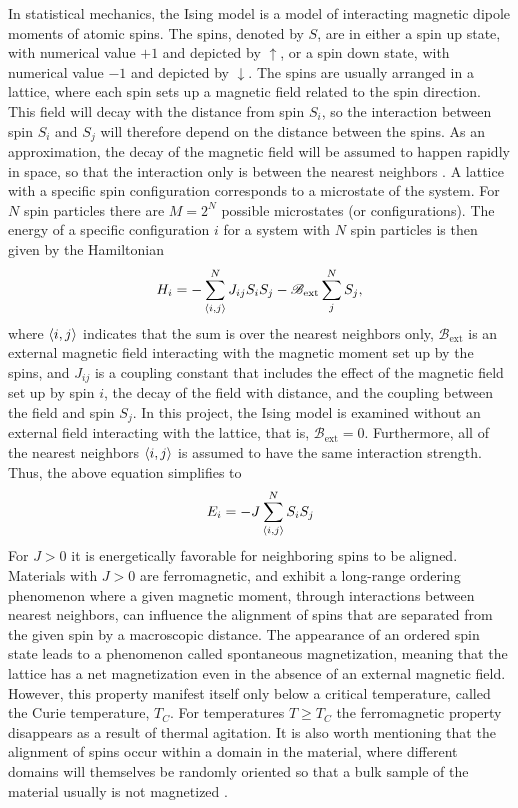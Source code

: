 In statistical mechanics, the Ising model is a model of interacting magnetic dipole moments of atomic spins. The spins, denoted by $S$, are in either a spin up state, with numerical value $+1$ and depicted by $\uparrow$, or a spin down state, with numerical value $- 1$ and depicted by $\downarrow$. The spins are usually arranged in a lattice, where each spin sets up a magnetic field related to the spin direction. This field will decay with the distance from spin $S_i$, so the interaction between spin $S_i$ and $S_j$ will therefore depend on the distance between the spins. As an approximation, the decay of the magnetic field will be assumed to happen rapidly in space, so that the interaction only is between the nearest neighbors \cite[p. 211-212]{Malthe}. A lattice with a specific spin configuration corresponds to a microstate of the system. For $N$ spin particles there are $M=2^N$ possible microstates (or configurations). The energy of a specific configuration $i$ for a system with $N$ spin particles is then given by the Hamiltonian \cite[p. 421]{MHJ}
\begin{equation*}
    H_i = - \sum_{\ev{i,j}}^N J_{ij} S_i S_j - \mathcal{B}_\mathrm{ext} \sum_{j}^N S_j ,
\end{equation*}
where $\ev{i,j}$ indicates that the sum is over the nearest neighbors only, $\mathcal{B}_\mathrm{ext}$ is an external magnetic field interacting with the magnetic moment set up by the spins, and $J_{ij}$ is a coupling constant that includes the effect of the magnetic field set up by spin $i$, the decay of the field with distance, and the coupling between the field and spin $S_j$. In this project, the Ising model is examined without an external field interacting with the lattice, that is, $\mathcal{B}_\mathrm{ext}=0$. Furthermore, all of the nearest neighbors $\ev{i,j}$ is assumed to have the same interaction strength. Thus, the above equation simplifies to
\begin{equation}\label{eq:ising energy}
    E_i = - J \sum_{\ev{i,j}}^N S_i S_j
\end{equation}
For $J>0$ it is energetically favorable for neighboring spins to be aligned. Materials with $J>0$ are ferromagnetic, and exhibit a long-range ordering phenomenon where a given magnetic moment, through interactions between nearest neighbors, can influence the alignment of spins that are separated from the given spin by a macroscopic distance. The appearance of an ordered spin state leads to a phenomenon called spontaneous magnetization, meaning that the lattice has a net magnetization even in the absence of an external magnetic field. However, this property manifest itself only below a critical temperature, called the Curie temperature, $T_C$. For temperatures $T\geq T_C$ the ferromagnetic property disappears as a result of thermal agitation. It is also worth mentioning that the alignment of spins occur within a domain in the material, where different domains will themselves be randomly oriented so that a bulk sample of the material usually is not magnetized \cite[p. 421-422]{MHJ}\cite{HyperPhys}.

